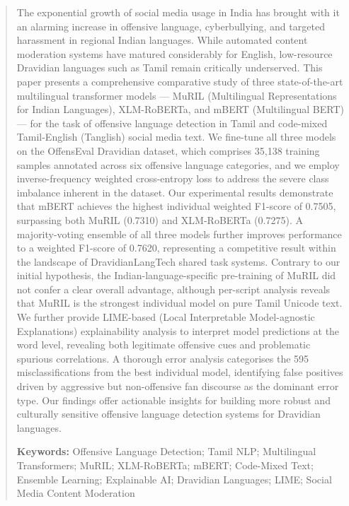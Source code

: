 \documentclass[12pt, a4paper]{article}
\begin{document}
\begin{abstract}
\noindent
The exponential growth of social media usage in India has brought with it an alarming increase in offensive language, cyberbullying, and targeted harassment in regional Indian languages. While automated content moderation systems have matured considerably for English, low-resource Dravidian languages such as Tamil remain critically underserved. This paper presents a comprehensive comparative study of three state-of-the-art multilingual transformer models --- MuRIL (Multilingual Representations for Indian Languages), XLM-RoBERTa, and mBERT (Multilingual BERT) --- for the task of offensive language detection in Tamil and code-mixed Tamil-English (Tanglish) social media text. We fine-tune all three models on the OffensEval Dravidian dataset, which comprises 35,138 training samples annotated across six offensive language categories, and we employ inverse-frequency weighted cross-entropy loss to address the severe class imbalance inherent in the dataset. Our experimental results demonstrate that mBERT achieves the highest individual weighted F1-score of 0.7505, surpassing both MuRIL (0.7310) and XLM-RoBERTa (0.7275). A majority-voting ensemble of all three models further improves performance to a weighted F1-score of 0.7620, representing a competitive result within the landscape of DravidianLangTech shared task systems. Contrary to our initial hypothesis, the Indian-language-specific pre-training of MuRIL did not confer a clear overall advantage, although per-script analysis reveals that MuRIL is the strongest individual model on pure Tamil Unicode text. We further provide LIME-based (Local Interpretable Model-agnostic Explanations) explainability analysis to interpret model predictions at the word level, revealing both legitimate offensive cues and problematic spurious correlations. A thorough error analysis categorises the 595 misclassifications from the best individual model, identifying false positives driven by aggressive but non-offensive fan discourse as the dominant error type. Our findings offer actionable insights for building more robust and culturally sensitive offensive language detection systems for Dravidian languages.

\vspace{0.8em}
\noindent\textbf{Keywords:} Offensive Language Detection; Tamil NLP; Multilingual Transformers; MuRIL; XLM-RoBERTa; mBERT; Code-Mixed Text; Ensemble Learning; Explainable AI; Dravidian Languages; LIME; Social Media Content Moderation
\end{abstract}
\end{document}
